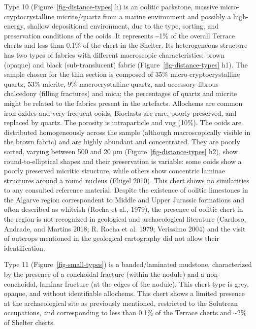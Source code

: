 \documentclass[
  a4paper,
  DIV=11,
  numbers=noendperiod]{scrreprt}
\begin{document}
Type 10 (Figure~\ref{fig-distance-types} h) is an oolitic packstone,
massive micro-cryptocrystalline micrite/quartz from a marine environment
and possibly a high-energy, shallow depositional environment, due to the
type, sorting, and preservation conditions of the ooids. It represents
\textasciitilde1\% of the overall Terrace cherts and less than 0.1\% of
the chert in the Shelter. Its heterogeneous structure has two types of
fabrics with different macroscopic characteristics: brown (opaque) and
black (sub-translucent) fabric (Figure~\ref{fig-distance-types} h1). The
sample chosen for the thin section is composed of 35\%
micro-cryptocrystalline quartz, 53\% micrite, 9\% macrocrystalline
quartz, and accessory fibrous chalcedony (filling fractures) and mica;
the percentages of quartz and micrite might be related to the fabrics
present in the artefacts. Allochems are common iron oxides and very
frequent ooids. Bioclasts are rare, poorly preserved, and replaced by
quartz. The porosity is intraparticle and vug (10\%). The ooids are
distributed homogeneously across the sample (although macroscopically
visible in the brown fabric) and are highly abundant and concentrated.
They are poorly sorted, varying between 500 and 20 μm
(Figure~\ref{fig-distance-types} h2), show round-to-elliptical shapes
and their preservation is variable: some ooids show a poorly preserved
micritic structure, while others show concentric laminae structures
around a round nucleus (Flügel 2010). This chert shows no similarities
to any consulted reference material. Despite the existence of oolitic
limestones in the Algarve region correspondent to Middle and Upper
Jurassic formations and often described as whiteish (Rocha et al.,
1979), the presence of oolitic chert in the region is not recognized in
geological and archaeological literature (Cardoso, Andrade, and Martins
2018; R. Rocha et al. 1979; Verissimo 2004) and the visit of outcrops
mentioned in the geological cartography did not allow their
identification.

Type 11 (Figure~\ref{fig-small-types}) is a banded/laminated mudstone,
characterized by the presence of a conchoidal fracture (within the
nodule) and a non-conchoidal, laminar fracture (at the edges of the
nodule). This chert type is grey, opaque, and without identifiable
allochems. This chert shows a limited presence at the archaeological
site as previously mentioned, restricted to the Solutrean occupations,
and corresponding to less than 0.1\% of the Terrace cherts and
\textasciitilde2\% of Shelter cherts.
\end{document}
